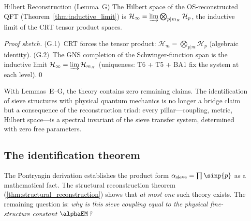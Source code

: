 \documentclass[12pt,a4paper]{article}
\begin{document}
\begin{thmbox}{Hilbert Reconstruction (Lemma~G)}\mTHM
\label{thm:hilbert_reconstruction}
The Hilbert space of the OS-reconstructed QFT
(Theorem~\ref{thm:inductive_limit}) is
$\mathcal{H}_\infty = \varinjlim \bigotimes_{p | m_K} \mathcal{H}_p$,
the inductive limit of the CRT tensor product spaces.
\end{thmbox}

\noindent\textit{Proof sketch.}
(G.1)~CRT forces the tensor product:
$\mathcal{H}_m = \bigotimes_{p|m} \mathcal{H}_p$ (algebraic identity).
(G.2)~The GNS completion of the Schwinger-function span is the
inductive limit $\mathcal{H}_\infty = \varinjlim \mathcal{H}_{m_K}$
(uniqueness: T6 + T5 + BA1 fix the system at each level).\qed

\medskip
With Lemmas~E--G, the theory contains zero remaining \BRIDGETAG{} claims.
The identification of sieve structures with physical quantum mechanics
is no longer a bridge claim but a consequence of the reconstruction
triad: every pillar---coupling, metric, Hilbert space---is a spectral
invariant of the sieve transfer system, determined with zero free
parameters.

\subsection{The identification theorem}
\label{sec:ch9_wightman}

The Pontryagin derivation establishes the product form
$\alpha_{\rm sieve} = \prod \sinp{p}$ as a mathematical fact.
The structural reconstruction theorem (\ref{thm:structural_reconstruction})
shows that \emph{at most one} such theory exists.
The remaining question is: \emph{why is this sieve coupling equal
to the physical fine-structure constant $\alphaEM$?}
\end{document}
